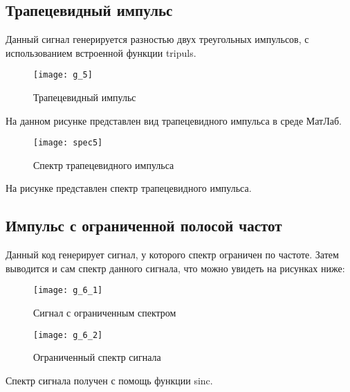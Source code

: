 \subsection{Трапецевидный импульс}


\parindent=1cm
Данный сигнал генерируется разностью двух треугольных импульсов, с использованием встроенной функции tripuls.

\begin{figure}[H]
	\begin{center}
		\texttt{[image: g\_5]}
		\caption{Трапецевидный импульс} 
		\label{pic:g_5} %
	\end{center}
\end{figure}
На данном рисунке представлен вид трапецевидного импульса в среде МатЛаб.

\begin{figure}[H]
	\begin{center}
		\texttt{[image: spec5]}
		\caption{Спектр трапецевидного импульса} 
		\label{pic:spec5} %
	\end{center}
\end{figure}
На рисунке представлен спектр трапецевидного импульса.

\subsection{Импульс с ограниченной полосой частот}


\parindent=1cm
Данный код генерирует сигнал, у которого спектр ограничен по частоте. Затем выводится и сам спектр данного сигнала, что можно увидеть на рисунках ниже:

\begin{figure}[H]
	\begin{center}
		\texttt{[image: g\_6\_1]}
		\caption{Сигнал с ограниченным спектром} 
		\label{pic:g_6_1} %
	\end{center}
\end{figure}
\begin{figure}[H]
	\begin{center}
		\texttt{[image: g\_6\_2]}
		\caption{Ограниченный спектр сигнала} 
		\label{pic:g_6_2} %
	\end{center}
\end{figure}
Спектр сигнала получен с помощь функции sinc.

